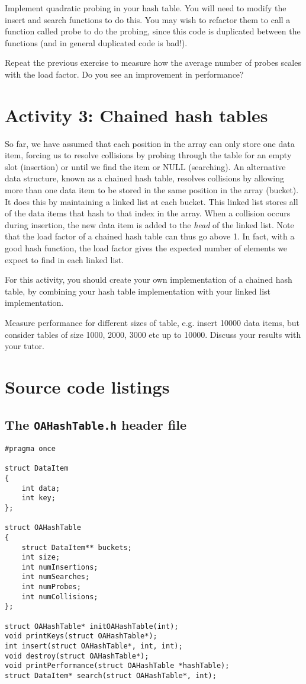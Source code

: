 \documentclass[10pt, a4paper, twosize]{article}
\begin{document}
Implement quadratic probing in your hash table. You will need to modify the insert and search functions to do this. You may wish to refactor them to call a function called probe to do the probing, since this code is duplicated between the functions (and in general duplicated code is bad!).

Repeat the previous exercise to measure how the average number of probes scales with the load factor. Do you see an improvement in performance?

\section{Activity 3: Chained hash tables} 
So far, we have assumed that each position in the array can only store one data item, forcing us to resolve collisions by probing through the table for an empty slot (insertion) or until we find the item or NULL (searching). An alternative data structure, known as a chained hash table, resolves collisions by allowing more than one data item to be stored in the same position in the array (bucket). It does this by maintaining a linked list at each bucket. This linked list stores all of the data items that hash to that index in the array. When a collision occurs during insertion, the new data item is added to the \emph{head} of the linked list. Note that the load factor of a chained hash table can thus go above 1. In fact, with a good hash function, the load factor gives the expected number of elements we expect to find in each linked list.

For this activity, you should create your own implementation of a chained hash table, by combining your hash table implementation with your linked list implementation.  

Measure performance for different sizes of table, e.g. insert 10000 data items, but consider tables of size 1000, 2000, 3000 etc up to 10000. Discuss your results with your tutor.


\section{Source code listings}
\subsection{The \texttt{OAHashTable.h} header file}
\begin{lstlisting}
#pragma once

struct DataItem 
{
	int data;
	int key;
};

struct OAHashTable
{
	struct DataItem** buckets;
	int size;
	int numInsertions;
	int numSearches;
	int numProbes;
	int numCollisions;
};

struct OAHashTable* initOAHashTable(int);
void printKeys(struct OAHashTable*);
int insert(struct OAHashTable*, int, int);
void destroy(struct OAHashTable*);
void printPerformance(struct OAHashTable *hashTable);
struct DataItem* search(struct OAHashTable*, int);
\end{lstlisting}
\end{document}
